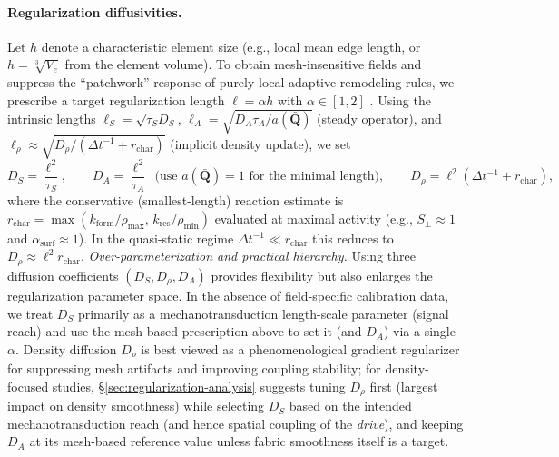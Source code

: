 \paragraph{Regularization diffusivities.}
Let $h$ denote a characteristic element size (e.g., local mean edge length, or $h=\sqrt[3]{V_e}$ from the element volume). To obtain mesh-insensitive fields and suppress the ``patchwork'' response of purely local adaptive remodeling rules, we prescribe a target regularization length $\ell=\alpha h$ with $\alpha\in[1,2]$ \cite{Weinans1992_BehaviorAdaptiveBoneRemodeling,Peerlings1998,Giorgio2019_MechanicallyDrivenBiological}. Using the intrinsic lengths $\ell_S=\sqrt{\tau_S D_S}$, $\ell_A=\sqrt{D_A\tau_A/a(\bar{\mathbf{Q}})}$ (steady operator), and $\ell_\rho\approx\sqrt{D_\rho/(\Delta t^{-1}+r_{\mathrm{char}})}$ (implicit density update), we set
\begin{equation}
D_S=\frac{\ell^2}{\tau_S},\qquad
D_A=\frac{\ell^2}{\tau_A}\ \ \text{(use $a(\bar{\mathbf{Q}})=1$ for the minimal length)},\qquad
D_\rho=\ell^2\left(\Delta t^{-1}+r_{\mathrm{char}}\right),
\end{equation}
where the conservative (smallest-length) reaction estimate is $r_{\mathrm{char}}=\max\!\left(k_{\mathrm{form}}/\rho_{\max},\,k_{\mathrm{res}}/\rho_{\min}\right)$ evaluated at maximal activity (e.g., $S_\pm\approx 1$ and $\alpha_{\mathrm{surf}}\approx 1$). In the quasi-static regime $\Delta t^{-1}\ll r_{\mathrm{char}}$ this reduces to $D_\rho\approx \ell^2 r_{\mathrm{char}}$.
\emph{Over-parameterization and practical hierarchy.}
Using three diffusion coefficients $(D_S,D_\rho,D_A)$ provides flexibility but also enlarges the regularization parameter space.
In the absence of field-specific calibration data, we treat $D_S$ primarily as a mechanotransduction length-scale parameter (signal reach) and use the mesh-based prescription above to set it (and $D_A$) via a single $\alpha$.
Density diffusion $D_\rho$ is best viewed as a phenomenological gradient regularizer for suppressing mesh artifacts and improving coupling stability; for density-focused studies, \S\ref{sec:regularization-analysis} suggests tuning $D_\rho$ first (largest impact on density smoothness) while selecting $D_S$ based on the intended mechanotransduction reach (and hence spatial coupling of the \emph{drive}), and keeping $D_A$ at its mesh-based reference value unless fabric smoothness itself is a target.

